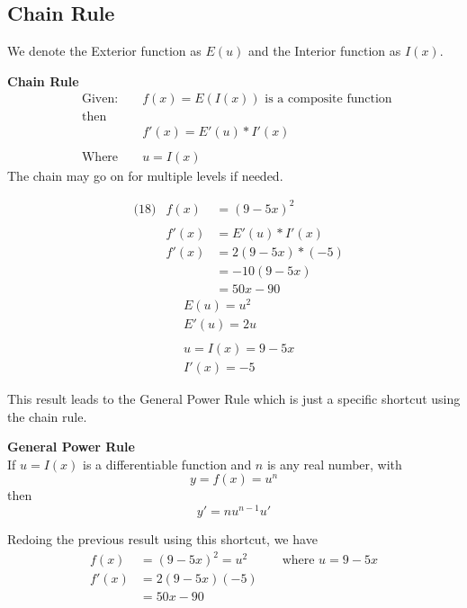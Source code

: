 \documentclass[14pt]{extarticle}
\begin{document}
\subsection{Chain Rule}
We denote the Exterior function as $E(u)$ and the Interior function as $I(x)$.

\begin{tcolorbox}[enhanced jigsaw,colback=bg,boxrule=0pt,arc=0pt]
	\textbf{Chain Rule}
	\begin{align*}
		&\text{Given: } & &f(x)= E(I(x)) \text{ is a composite function } \\
		&\text{then }\\
		& & &f'(x) = E'(u) * I'(x) \\\\
		&\text{Where }& & u=I(x)
	\end{align*}
	The chain may go on for multiple levels if needed.
\end{tcolorbox}

\begin{multicols}{2}
	\begin{align*}
		&\text{(18)} &f(x) &= (9-5x)^2 \\\\
		&			&f'(x) &= E'(u)*I'(x) \\
		&			&f'(x) &= 2(9-5x)*(-5) \\
		&			&    &=-10(9-5x) \\
		&			&    &= 50x - 90
	\end{align*}
	\vfill\null
	\columnbreak
	\begin{align*}
		&E(u) = u^2 \\
		&E'(u) = 2u \\\\
		&u = I(x)=9-5x \\
		& I'(x) = -5
	\end{align*}
\vfill\null
\end{multicols}

This result leads to the General Power Rule which is just a specific shortcut using the chain rule.

\begin{tcolorbox}[enhanced jigsaw,colback=bg,boxrule=0pt,arc=0pt]
	\textbf{General Power Rule} \\
	If $u=I(x)$ is a differentiable function and $n$ is any real number, with $$y=f(x) = u^n$$ then $$y'=n u^{n-1} u'$$
\end{tcolorbox}
Redoing the previous result using this shortcut, we have
\begin{align*}
	f(x) &= (9-5x)^2 = u^2  && \text{ where } u=9-5x \\
	f'(x) &= 2(9-5x)(-5) \\
	 &= 50x-90 
\end{align*}
\end{document}
